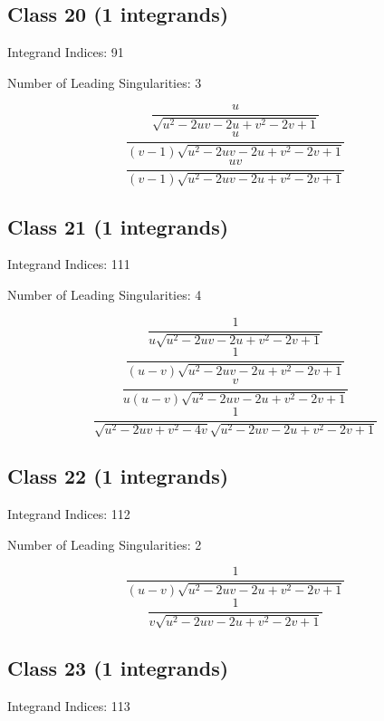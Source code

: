 \documentclass[11pt,a4paper]{article}
\begin{document}
\subsection*{Class 20 (1 integrands)}
Integrand Indices: 91

Number of Leading Singularities: 3

\begin{equation}
\frac{u}{\sqrt{u^2-2 u v-2 u+v^2-2 v+1}}
\end{equation}
\begin{equation}
\frac{u}{(v-1) \sqrt{u^2-2 u v-2 u+v^2-2 v+1}}
\end{equation}
\begin{equation}
\frac{u v}{(v-1) \sqrt{u^2-2 u v-2 u+v^2-2 v+1}}
\end{equation}


\subsection*{Class 21 (1 integrands)}
Integrand Indices: 111

Number of Leading Singularities: 4

\begin{equation}
\frac{1}{u \sqrt{u^2-2 u v-2 u+v^2-2 v+1}}
\end{equation}
\begin{equation}
\frac{1}{(u-v) \sqrt{u^2-2 u v-2 u+v^2-2 v+1}}
\end{equation}
\begin{equation}
\frac{v}{u (u-v) \sqrt{u^2-2 u v-2 u+v^2-2 v+1}}
\end{equation}
\begin{equation}
\frac{1}{\sqrt{u^2-2 u v+v^2-4 v} \sqrt{u^2-2 u v-2 u+v^2-2 v+1}}
\end{equation}


\subsection*{Class 22 (1 integrands)}
Integrand Indices: 112

Number of Leading Singularities: 2

\begin{equation}
\frac{1}{(u-v) \sqrt{u^2-2 u v-2 u+v^2-2 v+1}}
\end{equation}
\begin{equation}
\frac{1}{v \sqrt{u^2-2 u v-2 u+v^2-2 v+1}}
\end{equation}


\subsection*{Class 23 (1 integrands)}
Integrand Indices: 113
\end{document}
